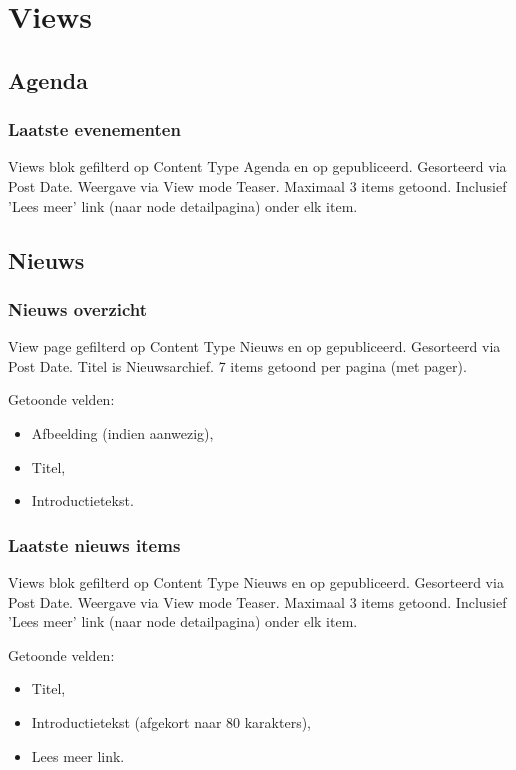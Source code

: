 \section{Views}\label{views}

\subsection{Agenda}
\subsubsection{Laatste evenementen}\label{laatste-agenda-items}
Views blok gefilterd op Content Type Agenda en op gepubliceerd. Gesorteerd via Post Date. Weergave via View mode Teaser. Maximaal 3 items getoond. Inclusief 'Lees meer' link (naar node detailpagina) onder elk item.

\subsection{Nieuws}
\subsubsection{Nieuws overzicht}\label{nieuws-overzicht}
View page gefilterd op Content Type Nieuws en op gepubliceerd. Gesorteerd via Post Date. Titel is Nieuwsarchief. 7 items getoond per pagina (met pager).

Getoonde velden:
\begin{itemize}
\item Afbeelding (indien aanwezig),
\item Titel,
\item Introductietekst.
\end{itemize}

\subsubsection{Laatste nieuws items}\label{laatste-nieuws-items}
Views blok gefilterd op Content Type Nieuws en op gepubliceerd. Gesorteerd via Post Date. Weergave via View mode Teaser.
Maximaal 3 items getoond. Inclusief 'Lees meer' link (naar node detailpagina) onder elk item.

Getoonde velden:
\begin{itemize}
\item Titel,
\item Introductietekst (afgekort naar 80 karakters),
\item Lees meer link.
\end{itemize}

